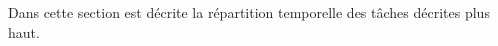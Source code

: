 \documentclass{article}
\begin{document}
Dans cette section est décrite la répartition temporelle des tâches décrites plus haut.


\newpage

\end{document}
